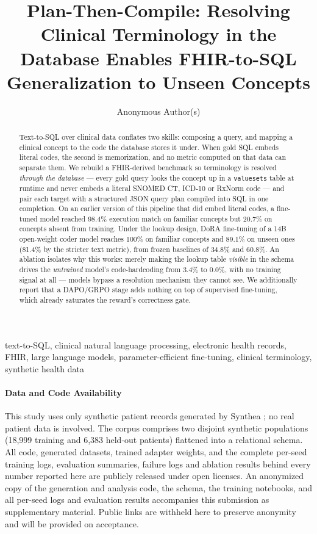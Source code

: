 \documentclass[pmlr,twocolumn,10pt]{jmlr} %
\title[Plan-Then-Compile]{Plan-Then-Compile: Resolving Clinical Terminology
in the Database Enables FHIR-to-SQL Generalization to Unseen Concepts}
\author{Anonymous Author(s)}
\begin{document}
\maketitle

\ifmlhdemo\else
\begin{abstract}
Text-to-SQL over clinical data conflates two skills: composing a query, and
mapping a clinical concept to the code the database stores it under. When gold
SQL embeds literal codes, the second is memorization, and no metric computed on
that data can separate them. We rebuild a FHIR-derived benchmark so terminology
is resolved \emph{through the database} --- every gold query looks the concept up
in a \texttt{valuesets} table at runtime and never embeds a literal SNOMED CT,
ICD-10 or RxNorm code --- and pair each target with a structured JSON query plan
compiled into SQL in one completion. On an earlier version of this pipeline that
did embed literal codes, a fine-tuned model reached 98.4\% execution match on
familiar concepts but 20.7\% on concepts absent from training. Under the lookup
design, DoRA fine-tuning of a 14B open-weight coder model reaches 100\% on
familiar concepts and 89.1\% on unseen ones (81.4\% by the stricter text metric),
from frozen baselines of 34.8\% and 60.8\%. An ablation isolates why this works:
merely making the lookup table \emph{visible} in the schema drives the
\emph{untrained} model's code-hardcoding from 3.4\% to 0.0\%, with no training
signal at all --- models bypass a resolution mechanism they cannot see. We
additionally report that a DAPO/GRPO stage adds nothing on top of supervised
fine-tuning, which already saturates the reward's correctness gate.
\end{abstract}
\begin{keywords}
text-to-SQL, clinical natural language processing, electronic health records,
FHIR, large language models, parameter-efficient fine-tuning, clinical
terminology, synthetic health data
\end{keywords}
\fi

\ifmlhneedsstatements
\paragraph*{Data and Code Availability}
This study uses only synthetic patient records generated by Synthea
\citep{walonoski2018synthea}; no real patient data is involved. The corpus
comprises two disjoint synthetic populations (18,999 training and 6,383 held-out
patients) flattened into a relational schema. All code, generated datasets,
trained adapter weights, and the complete per-seed training logs, evaluation
summaries, failure logs and ablation results behind every number reported here
are publicly released under open licenses. An anonymized copy of the generation
and analysis code, the schema, the training notebooks, and all per-seed logs and
evaluation results accompanies this submission as supplementary material. Public
links are withheld here to preserve anonymity and will be provided on acceptance.
\end{document}
